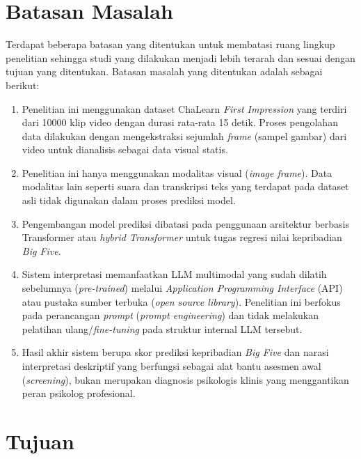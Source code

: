 \section{Batasan Masalah}
\label{sec:batasanmasalah}

Terdapat beberapa batasan yang ditentukan untuk membatasi ruang lingkup penelitian sehingga studi yang dilakukan menjadi lebih terarah dan sesuai dengan tujuan yang ditentukan. Batasan masalah yang ditentukan adalah sebagai berikut:

\begin{enumerate}[nosep]
	\item Penelitian ini menggunakan dataset ChaLearn \textit{First Impression} \parencite{Ponce-Lpez2016} yang terdiri dari 10000 klip video dengan durasi rata-rata 15 detik. Proses pengolahan data dilakukan dengan mengekstraksi sejumlah \textit{frame} (sampel gambar) dari video untuk dianalisis sebagai data visual statis.

	\item Penelitian ini hanya menggunakan modalitas visual (\textit{image frame}). Data modalitas lain seperti suara dan transkripsi teks yang terdapat pada dataset asli tidak digunakan dalam proses prediksi model.

	\item Pengembangan model prediksi dibatasi pada penggunaan arsitektur berbasis Transformer atau \textit{hybrid Transformer} untuk tugas regresi nilai kepribadian \textit{Big Five}.

	\item Sistem interpretasi memanfaatkan LLM multimodal yang sudah dilatih sebelumnya (\textit{pre-trained}) melalui \textit{Application Programming Interface} (API) atau pustaka sumber terbuka (\textit{open source library}). Penelitian ini berfokus pada perancangan \textit{prompt} (\textit{prompt engineering}) dan tidak melakukan pelatihan ulang/\textit{fine-tuning} pada struktur internal LLM tersebut.

	\item Hasil akhir sistem berupa skor prediksi kepribadian \textit{Big Five} dan narasi interpretasi deskriptif yang berfungsi sebagai alat bantu asesmen awal (\textit{screening}), bukan merupakan diagnosis psikologis klinis yang menggantikan peran psikolog profesional.
\end{enumerate}


\section{Tujuan}
\label{sec:Tujuan}

